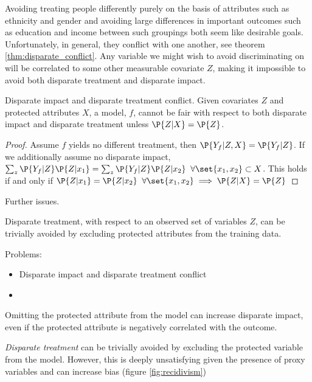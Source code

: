 Avoiding treating people differently purely on the basis of attributes such as ethnicity and gender and avoiding large differences in important outcomes such as education and income between such groupings both seem like desirable goals. Unfortunately, in general, they conflict with one another, see theorem \ref{thm:disparate_conflict}. Any variable we might wish to avoid discriminating on will be correlated to some other measurable covariate $Z$, making it impossible to avoid both disparate treatment and disparate impact. 
\vspace{.2cm}
\begin{theorem} 
\label{thm:disparate_conflict}
Disparate impact and disparate treatment conflict. Given covariates $Z$ and protected attributes $X$, a model, $f$, cannot be fair with respect to both disparate impact and disparate treatment unless $\P{Z|X} = \P{Z}$.
\begin{proof} Assume $f$ yields no different treatment, then $\P{Y_f|Z,X} = \P{Y_f|Z}$. If we additionally assume no disparate impact, $\sum_z{\P{Y_f|Z}\P{Z|x_1}} = \sum_z{\P{Y_f|Z}\P{Z|x_2}} \;\; \forall \set{x_1,x_2}\subset X$. This holds if and only if $\P{Z|x_1} = \P{Z|x_2} \;\; \forall \set{x_1,x_2} \implies \P{Z|X} = \P{Z}$
\end{proof} 
\end{theorem}  

Further issues.


Disparate treatment, with respect to an observed set of variables $Z$, can be trivially avoided by excluding protected attributes from the training data. 

Problems:
\begin{itemize}
\item Disparate impact and disparate treatment conflict
\item 
\end{itemize}




Omitting the protected attribute from the model can increase disparate impact, even if the protected attribute is negatively correlated with the outcome. 


\textit{Disparate treatment} can be trivially avoided by excluding the protected variable from the model. However, this is deeply unsatisfying given the presence of proxy variables and can increase bias (figure \ref{fig:recidivism})


